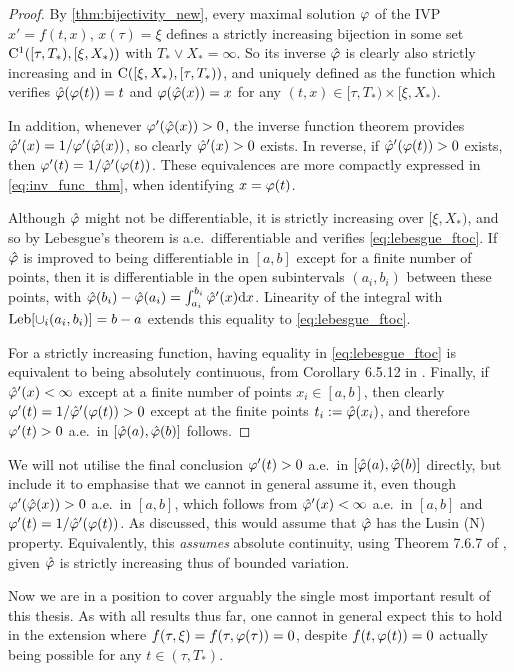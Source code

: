 \begin{proof}
    By \autoref{thm:bijectivity_new}, every maximal solution $\varphi$ of the IVP $x'=f(t,x)$, $x(\tau)=\xi$ defines a strictly increasing bijection in some set $\mathrm{C}^1([\tau,T_*),[\xi,X_*))$ with $T_*\vee X_*=\infty$. So its inverse $\hat{\varphi}$ is clearly also strictly increasing and in $\mathrm{C}([\xi,X_*),[\tau,T_*))$, and uniquely defined as the function which verifies $\hat{\varphi}(\varphi(t))=t$ and $\varphi(\hat{\varphi}(x))=x$ for any $(t,x)\in[\tau,T_*)\times[\xi,X_*)$.

    In addition, whenever $\varphi'(\hat{\varphi}(x))>0$, the inverse function theorem provides $\hat{\varphi}'(x)=1/\varphi'(\hat{\varphi}(x))$, so clearly $\hat{\varphi}'(x)>0$ exists. In reverse, if $\hat{\varphi}'(\varphi(t))>0$ exists, then $\varphi'(t)=1/\hat{\varphi}'(\varphi(t))$. These equivalences are more compactly expressed in \autoref{eq:inv_func_thm}, when identifying $x=\varphi(t)$.

    Although $\hat{\varphi}$ might not be differentiable, it is strictly increasing over $[\xi,X_*)$, and so by Lebesgue's theorem is a.e.~differentiable and verifies \autoref{eq:lebesgue_ftoc}. If $\hat{\varphi}$ is improved to being differentiable in $[a,b]$ except for a finite number of points, then it is differentiable in the open subintervals $(a_i,b_i)$ between these points, with $\hat{\varphi}(b_i) - \hat{\varphi}(a_i) = \int_{a_i}^{b_i}\hat{\varphi}'(x)\mathrm{d} x$. Linearity of the integral with $\operatorname*{Leb}[\cup_i(a_i,b_i)]=b-a$ extends this equality to \autoref{eq:lebesgue_ftoc}.

    For a strictly increasing function, having equality in \autoref{eq:lebesgue_ftoc} is equivalent to being absolutely continuous, from Corollary 6.5.12 in \cite{royden_2010}. Finally, if $\hat{\varphi}'(x)<\infty$ except at a finite number of points $x_i\in[a,b]$, then clearly $\varphi'(t)=1/\hat{\varphi}'(\varphi(t))>0$ except at the finite points $t_i:=\hat{\varphi}(x_i)$, and therefore $\varphi'(t)>0$ a.e.~in $[\hat{\varphi}(a),\hat{\varphi}(b)]$ follows.
\end{proof}

\vspace{2mm}We will not utilise the final conclusion $\varphi'(t)>0$ a.e.~in $[\hat{\varphi}(a),\hat{\varphi}(b)]$ directly, but include it to emphasise that we cannot in general assume it, even though $\varphi'(\hat{\varphi}(x))>0$ a.e.~in $[a,b]$, which follows from $\hat{\varphi}'(x)<\infty$ a.e.~in $[a,b]$ and $\varphi'(t)=1/\hat{\varphi}'(\varphi(t))$. As discussed, this would assume that $\hat{\varphi}$ has the Lusin (N) property. Equivalently, this \emph{assumes} absolute continuity, using Theorem 7.6.7 of \cite{saks_1937}, given $\hat{\varphi}$ is strictly increasing thus of bounded variation.

Now we are in a position to cover arguably the single most important result of this thesis. As with all results thus far, one cannot in general expect this to hold in the extension where $f(\tau,\xi)=f(\tau,\varphi(\tau))=0$, despite $f(t,\varphi(t))=0$ actually being possible for any $t\in(\tau,T_*)$.

